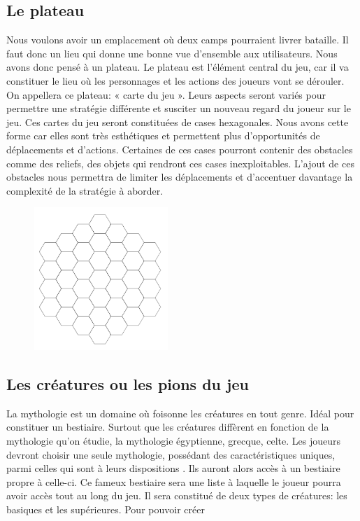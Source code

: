 \documentclass[12pt]{extarticle}
\begin{document}
\subsection{Le plateau}

Nous voulons avoir un emplacement où deux camps pourraient livrer bataille. Il faut donc un lieu qui donne une bonne vue d’ensemble aux utilisateurs. Nous avons donc pensé à un plateau. Le plateau est l’élément central du jeu, car il va constituer le lieu où les personnages et les actions des joueurs vont se dérouler. On appellera ce plateau: « carte du jeu ». Leurs aspects seront variés pour permettre une stratégie différente et susciter un nouveau regard du joueur sur le jeu. Ces cartes du jeu seront constituées de cases hexagonales. Nous avons cette forme car elles sont très esthétiques et permettent plus d’opportunités de déplacements et d’actions. Certaines de ces cases pourront contenir des obstacles comme des reliefs, des objets qui rendront ces cases inexploitables. L’ajout de ces obstacles nous permettra de limiter les déplacements et d’accentuer davantage la complexité de la stratégie à aborder.

\begin{figure}[!h]
	\center
	\includegraphics[width=0.45\textwidth]{cartedebase}
\end{figure}

\newpage

\subsection{Les créatures ou les pions du jeu}

La mythologie est un domaine où foisonne les créatures en tout genre. Idéal pour constituer un bestiaire. Surtout que les créatures diffèrent en fonction de la mythologie qu’on étudie, la mythologie égyptienne, grecque, celte. Les joueurs devront choisir une seule mythologie, possédant des caractéristiques uniques, parmi celles qui sont à leurs dispositions . Ils auront alors accès à un bestiaire propre à celle-ci. Ce fameux bestiaire sera une liste à laquelle le joueur pourra avoir accès tout au long du jeu. Il sera constitué de deux types de créatures: les basiques et les supérieures. Pour pouvoir créer
\end{document}
